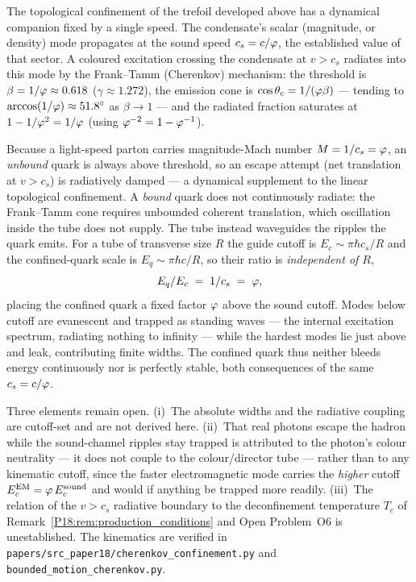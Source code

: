 \begin{remark}
\label{P18:rem:cherenkov_confinement}
The topological confinement of the trefoil developed above has a dynamical
companion fixed by a single speed. The condensate's scalar (magnitude, or
density) mode propagates at the sound speed $c_s=c/\varphi$, the established
value of that sector. A coloured excitation crossing the condensate at
$v>c_s$ radiates into this mode by the Frank--Tamm (Cherenkov) mechanism:
the threshold is $\beta=1/\varphi\approx0.618$ ($\gamma\approx1.272$), the
emission cone is $\cos\theta_c=1/(\varphi\beta)$ --- tending to
$\arccos(1/\varphi)\approx51.8^\circ$ as $\beta\to1$ --- and the radiated
fraction saturates at $1-1/\varphi^{2}=1/\varphi$ (using $\varphi^{-2}=1-\varphi^{-1}$).

Because a light-speed parton carries magnitude-Mach number $M=1/c_s=\varphi$,
an \emph{unbound} quark is always above threshold, so an escape attempt
(net translation at $v>c_s$) is radiatively damped --- a dynamical
supplement to the linear topological confinement. A \emph{bound} quark
does not continuously radiate: the Frank--Tamm cone requires unbounded
coherent translation, which oscillation inside the tube does not supply.
The tube instead waveguides the ripples the quark emits. For a tube of
transverse size $R$ the guide cutoff is $E_c\sim\pi\hbar c_s/R$ and the
confined-quark scale is $E_q\sim\pi\hbar c/R$, so their ratio is
\emph{independent of $R$},
\begin{equation}
  E_q/E_c \;=\; 1/c_s \;=\; \varphi,
  \label{P18:eq:confined_mach}
\end{equation}
placing the confined quark a fixed factor $\varphi$ above the sound cutoff.
Modes below cutoff are evanescent and trapped as standing waves --- the
internal excitation spectrum, radiating nothing to infinity --- while the
hardest modes lie just above and leak, contributing finite widths. The
confined quark thus neither bleeds energy continuously nor is perfectly
stable, both consequences of the same $c_s=c/\varphi$.

Three elements remain open. (i)~The absolute widths and the radiative
coupling are cutoff-set and are not derived here. (ii)~That real photons
escape the hadron while the sound-channel ripples stay trapped is
attributed to the photon's colour neutrality --- it does not couple to the
colour/director tube --- rather than to any kinematic cutoff, since the
faster electromagnetic mode carries the \emph{higher} cutoff
$E_c^{\rm EM}=\varphi\,E_c^{\rm sound}$ and would if anything be trapped more
readily. (iii)~The relation of the $v>c_s$ radiative boundary to the
deconfinement temperature $T_c$ of
Remark~\ref{P18:rem:production_conditions} and Open Problem~O6 is
unestablished. The kinematics are verified in
\texttt{papers/src\_paper18/cherenkov\_confinement.py} and
\texttt{bounded\_motion\_cherenkov.py}.
\end{remark}

